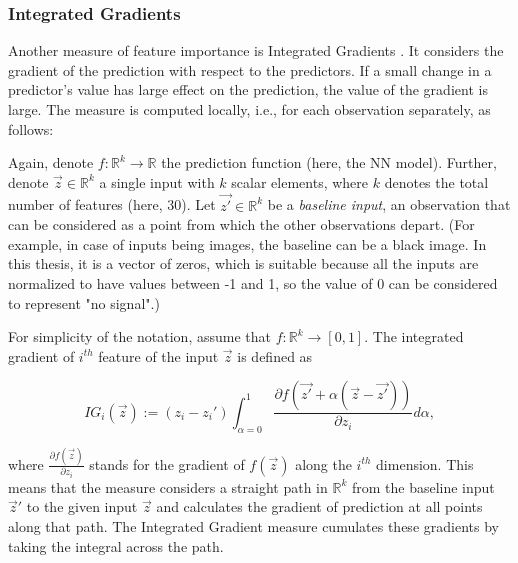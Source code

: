		
	
		
	\subsubsection{Integrated Gradients}
		Another measure of feature importance is Integrated Gradients \citep{sundararajan2017axiomatic}. It considers the gradient of the prediction with respect to the predictors. If a small change in a predictor's value has large effect on the prediction, the value of the gradient is large. The measure is computed locally, i.e., for each observation separately, as follows:
		
		Again, denote $f: \mathbb{R}^k \rightarrow \mathbb{R}$ the prediction function (here, the NN model). Further, denote $\vec{z} \in  \mathbb{R}^k$ a single input with $k$ scalar elements, where $k$ denotes the total number of features (here, 30). Let $\vec{z'} \in  \mathbb{R}^k$ be a \textit{baseline input}, an observation that can be considered as a point from which the other observations depart. (For example, in case of inputs being images, the baseline can be a black image. In this thesis, it is a vector of zeros, which is suitable because all the inputs are normalized to have values between -1 and 1, so the value of 0 can be considered to represent "no signal".) 
		
		For simplicity of the notation, assume that $f: \mathbb{R}^k \rightarrow [0,1]$. The integrated gradient of $i^{th}$ feature of the input $\vec{z}$ is defined as 
		
		\begin{equation}
			IG_i(\vec{z}) := (z_i - z_i') \int_{\alpha=0}^{1} \frac{\partial f(\vec{z'} + \alpha(\vec{z}-\vec{z'}))}{\partial z_i}d\alpha,
		\end{equation}
		
		where $\frac{\partial f(\vec{z})}{\partial z_i}$ stands for the gradient of $f(\vec{z})$ along the $i^{th}$ dimension. This means that the measure considers a straight path in $\mathbb{R}^k$ from the baseline input ${\vec{z}'}$ to the given input ${\vec{z}}$ and calculates the gradient of prediction at all points along that path. The Integrated Gradient measure cumulates these gradients by taking the integral across the path.    


